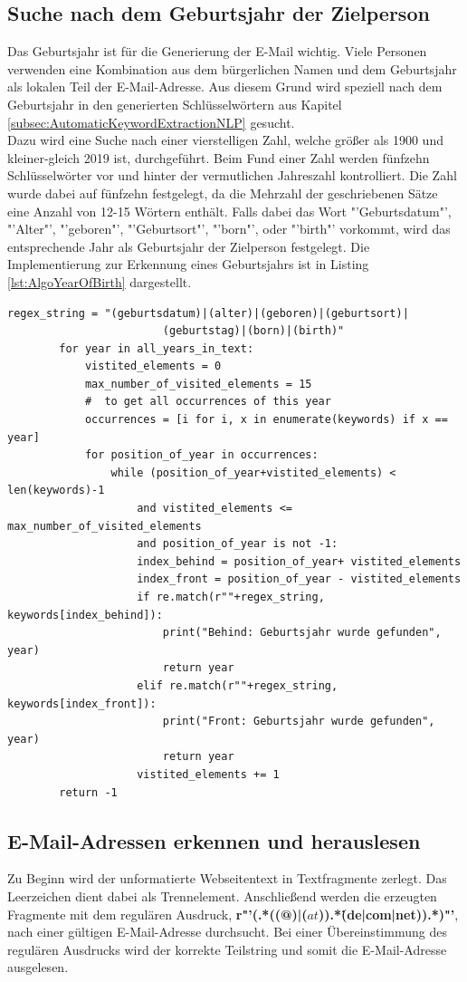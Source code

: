 	\subsection{Suche nach dem Geburtsjahr der Zielperson}
		Das Geburtsjahr ist für die Generierung der E-Mail wichtig. Viele Personen verwenden eine Kombination aus dem bürgerlichen Namen und dem Geburtsjahr als lokalen Teil der E-Mail-Adresse. Aus diesem Grund wird speziell nach dem Geburtsjahr in den generierten Schlüsselwörtern aus Kapitel \ref{subsec:AutomaticKeywordExtractionNLP} gesucht.\\
		Dazu wird eine Suche nach einer vierstelligen Zahl, welche größer als 1900 und kleiner-gleich 2019 ist, durchgeführt. Beim Fund einer Zahl werden  fünfzehn Schlüsselwörter vor und hinter der vermutlichen Jahreszahl kontrolliert. Die Zahl wurde dabei auf fünfzehn festgelegt, da die Mehrzahl der geschriebenen Sätze eine Anzahl von 12-15 Wörtern enthält. \cite{seibicke1969schreibt} Falls dabei das Wort "'Geburtsdatum"', "'Alter"', "'geboren"', "'Geburtsort"', "'born"', oder "'birth"' vorkommt, wird das entsprechende Jahr als Geburtsjahr der Zielperson festgelegt. Die Implementierung zur Erkennung eines Geburtsjahrs ist in Listing \ref{lst:AlgoYearOfBirth} dargestellt.\\
		
		\begin{lstlisting}[caption=Algorithmus zur Suche nach dem Geburtsjahr,label={lst:AlgoYearOfBirth}]
		regex_string = "(geburtsdatum)|(alter)|(geboren)|(geburtsort)|	
						(geburtstag)|(born)|(birth)"
		for year in all_years_in_text:
			vistited_elements = 0
			max_number_of_visited_elements = 15
			#  to get all occurrences of this year
			occurrences = [i for i, x in enumerate(keywords) if x == year]
			for position_of_year in occurrences:
				while (position_of_year+vistited_elements) < len(keywords)-1 
					and vistited_elements <= max_number_of_visited_elements 
					and position_of_year is not -1:
					index_behind = position_of_year+ vistited_elements
					index_front = position_of_year - vistited_elements
					if re.match(r""+regex_string, keywords[index_behind]):
						print("Behind: Geburtsjahr wurde gefunden", year)
						return year
					elif re.match(r""+regex_string, keywords[index_front]):
						print("Front: Geburtsjahr wurde gefunden", year)
						return year
					vistited_elements += 1
		return -1
		\end{lstlisting} 
		
	\subsection{E-Mail-Adressen erkennen und herauslesen}
		Zu Beginn wird der unformatierte Webseitentext in Textfragmente zerlegt. Das Leerzeichen dient dabei als Trennelement. Anschließend werden die erzeugten Fragmente mit dem regulären Ausdruck, \textbf{r"'(.*((@)|(\(at\))).*\.(de|com|net)).*)"'}, nach einer gültigen E-Mail-Adresse durchsucht. Bei einer Übereinstimmung des regulären Ausdrucks wird der korrekte Teilstring und somit die E-Mail-Adresse ausgelesen. 
		
